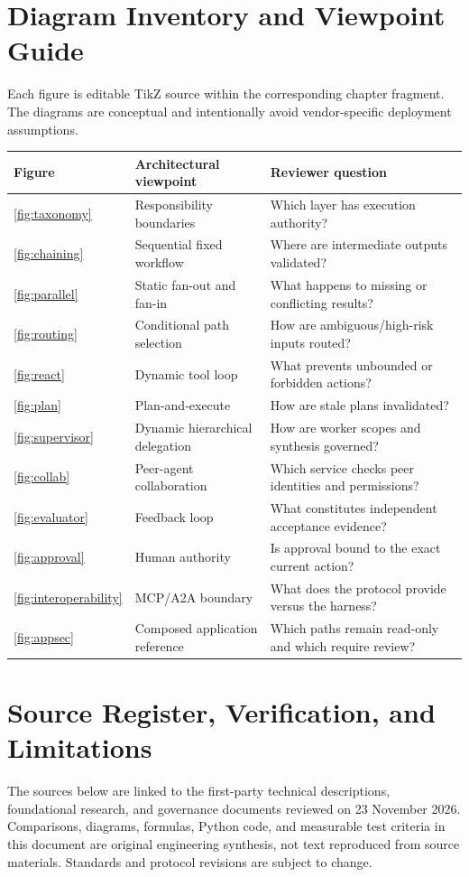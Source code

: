 
\appendix
\section{Diagram Inventory and Viewpoint Guide}
Each figure is editable TikZ source within the corresponding chapter fragment. The diagrams are conceptual and intentionally avoid vendor-specific deployment assumptions.

\begin{longtable}{@{}p{17mm}p{49mm}p{66mm}@{}}\toprule
\textbf{Figure} & \textbf{Architectural viewpoint} & \textbf{Reviewer question}\\\midrule\endhead
\ref{fig:taxonomy} & Responsibility boundaries & Which layer has execution authority?\\
\ref{fig:chaining} & Sequential fixed workflow & Where are intermediate outputs validated?\\
\ref{fig:parallel} & Static fan-out and fan-in & What happens to missing or conflicting results?\\
\ref{fig:routing} & Conditional path selection & How are ambiguous/high-risk inputs routed?\\
\ref{fig:react} & Dynamic tool loop & What prevents unbounded or forbidden actions?\\
\ref{fig:plan} & Plan-and-execute & How are stale plans invalidated?\\
\ref{fig:supervisor} & Dynamic hierarchical delegation & How are worker scopes and synthesis governed?\\
\ref{fig:collab} & Peer-agent collaboration & Which service checks peer identities and permissions?\\
\ref{fig:evaluator} & Feedback loop & What constitutes independent acceptance evidence?\\
\ref{fig:approval} & Human authority & Is approval bound to the exact current action?\\
\ref{fig:interoperability} & MCP/A2A boundary & What does the protocol provide versus the harness?\\
\ref{fig:appsec} & Composed application reference & Which paths remain read-only and which require review?\\\bottomrule
\end{longtable}

\section{Source Register, Verification, and Limitations}
The sources below are linked to the first-party technical descriptions, foundational research, and governance documents reviewed on 23 November 2026. Comparisons, diagrams, formulas, Python code, and measurable test criteria in this document are original engineering synthesis, not text reproduced from source materials. Standards and protocol revisions are subject to change.

